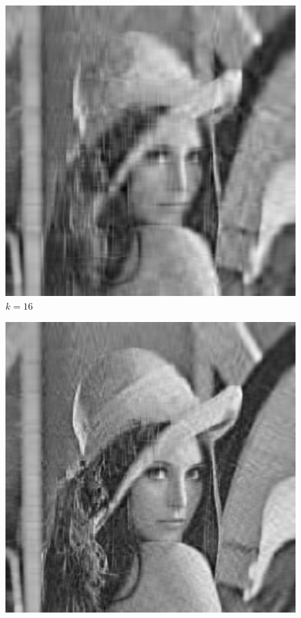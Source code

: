 \documentclass[10pt]{article}
\begin{document}
\begin{enumerate}[label=3.\arabic*]
\begin{figure}[H]
\begin{minipage}[c]{0.45\textwidth}
			\caption{$k=8$}
		\end{minipage}%
		\begin{minipage}[c]{0.45\textwidth}
			\centering
			\includegraphics[width=1\textwidth]{SVD/k = 16.png}
			\caption{$k=16$}
		\end{minipage}
	\end{figure}
 	\begin{figure}[H]
		\centering
		\begin{minipage}[c]{0.45\textwidth} 
			\centering
			\includegraphics[width=1\textwidth]{./SVD/k = 32.png}

\end{minipage}
\end{figure}
\end{enumerate}
\end{document}
